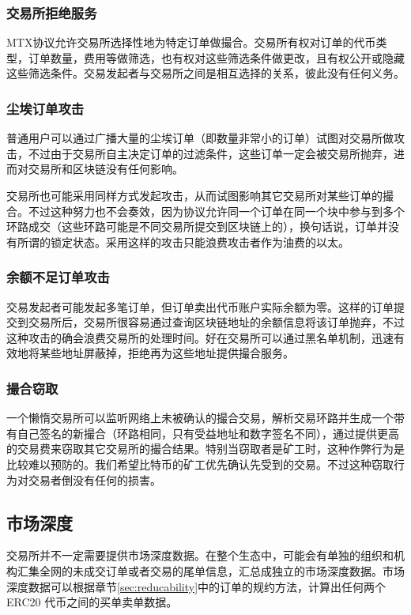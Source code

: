 \documentclass[UTF8,nofonts]{ctexart}
\begin{document}
\subsubsection{交易所拒绝服务}

MTX协议允许交易所选择性地为特定订单做撮合。交易所有权对订单的代币类型，订单数量，费用等做筛选，也有权对这些筛选条件做更改，且有权公开或隐藏这些筛选条件。交易发起者与交易所之间是相互选择的关系，彼此没有任何义务。

\subsubsection{尘埃订单攻击}
普通用户可以通过广播大量的尘埃订单（即数量非常小的订单）试图对交易所做攻击，不过由于交易所自主决定订单的过滤条件，这些订单一定会被交易所抛弃，进而对交易所和区块链没有任何影响。

交易所也可能采用同样方式发起攻击，从而试图影响其它交易所对某些订单的撮合。不过这种努力也不会奏效，因为协议允许同一个订单在同一个块中参与到多个环路成交（这些环路可能是不同交易所提交到区块链上的），换句话说，订单并没有所谓的锁定状态。采用这样的攻击只能浪费攻击者作为油费的以太。

\subsubsection{余额不足订单攻击}

交易发起者可能发起多笔订单，但订单卖出代币账户实际余额为零。这样的订单提交到交易所后，交易所很容易通过查询区块链地址的余额信息将该订单抛弃，不过这种攻击的确会浪费交易所的处理时间。好在交易所可以通过黑名单机制，迅速有效地将某些地址屏蔽掉，拒绝再为这些地址提供撮合服务。

\subsubsection{撮合窃取}

一个懒惰交易所可以监听网络上未被确认的撮合交易，解析交易环路并生成一个带有自己签名的新撮合（环路相同，只有受益地址和数字签名不同），通过提供更高的交易费来窃取其它交易所的撮合结果。特别当窃取者是矿工时，这种作弊行为是比较难以预防的。我们希望比特币的矿工优先确认先受到的交易。不过这种窃取行为对交易者倒没有任何的损害。

\subsection{市场深度\label{sec:marketdepth}}

交易所并不一定需要提供市场深度数据。在整个生态中，可能会有单独的组织和机构汇集全网的未成交订单或者交易的尾单信息，汇总成独立的市场深度数据。市场深度数据可以根据章节\ref{sec:reducability}中的订单的规约方法，计算出任何两个ERC20 代币之间的买单卖单数据。
\end{document}
